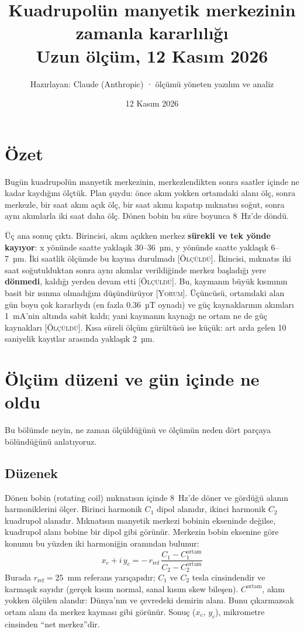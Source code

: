 \documentclass[11pt,a4paper]{article}
\title{Kuadrupolün manyetik merkezinin zamanla kararlılığı\\[0.3em]
\large Uzun ölçüm, 12 Kasım 2026}
\author{Hazırlayan: Claude (Anthropic) · ölçümü yöneten yazılım ve analiz}
\date{12 Kasım 2026}
\newcommand{\olc}{\textsc{[Ölçüldü]}}
\newcommand{\yor}{\textsc{[Yorum]}}
\begin{document}
\maketitle

\section*{Özet}

Bugün kuadrupolün manyetik merkezinin, merkezlendikten sonra saatler içinde ne kadar kaydığını ölçtük.
Plan şuydu: önce akım yokken ortamdaki alanı ölç, sonra merkezle, bir saat akım açık ölç, bir saat akımı
kapatıp mıknatısı soğut, sonra aynı akımlarla iki saat daha ölç. Dönen bobin bu süre boyunca 8~Hz'de döndü.

Üç ana sonuç çıktı. Birincisi, akım açıkken merkez \textbf{sürekli ve tek yönde kayıyor}: x yönünde
saatte yaklaşık 30--36~µm, y yönünde saatte yaklaşık 6--7~µm. İki saatlik ölçümde bu kayma durulmadı
\olc. İkincisi, mıknatıs iki saat soğutulduktan sonra aynı akımlar verildiğinde merkez başladığı yere
\textbf{dönmedi}, kaldığı yerden devam etti \olc. Bu, kaymanın büyük kısmının basit bir ısınma olmadığını
düşündürüyor \yor. Üçüncüsü, ortamdaki alan gün boyu çok kararlıydı (en fazla 0.36~µT oynadı) ve güç
kaynaklarının akımları 1~mA'nin altında sabit kaldı; yani kaymanın kaynağı ne ortam ne de güç kaynakları
\olc. Kısa süreli ölçüm gürültüsü ise küçük: art arda gelen 10 saniyelik kayıtlar arasında yaklaşık 2~µm.

\section{Ölçüm düzeni ve gün içinde ne oldu}

Bu bölümde neyin, ne zaman ölçüldüğünü ve ölçümün neden dört parçaya bölündüğünü anlatıyoruz.

\subsection{Düzenek}
Dönen bobin (rotating coil) mıknatısın içinde 8~Hz'de döner ve gördüğü alanın harmoniklerini ölçer.
Birinci harmonik $C_1$ dipol alanıdır, ikinci harmonik $C_2$ kuadrupol alanıdır. Mıknatısın manyetik
merkezi bobinin ekseninde değilse, kuadrupol alanı bobine bir dipol gibi görünür. Merkezin bobin eksenine
göre konumu bu yüzden iki harmoniğin oranından bulunur:
\begin{equation}
  x_c + i\,y_c = -\,r_\text{ref}\,\frac{C_1 - C_1^\text{ortam}}{C_2 - C_2^\text{ortam}}
\end{equation}
Burada $r_\text{ref} = 25$~mm referans yarıçapıdır; $C_1$ ve $C_2$ tesla cinsindendir ve karmaşık
sayıdır (gerçek kısım normal, sanal kısım skew bileşen). $C^\text{ortam}$, akım yokken ölçülen alandır: Dünya'nın
ve çevredeki demirin alanı. Bunu çıkarmazsak ortam alanı da merkez kayması gibi görünür. Sonuç ($x_c$, $y_c$),
mikrometre cinsinden ``net merkez''dir.
\end{document}
